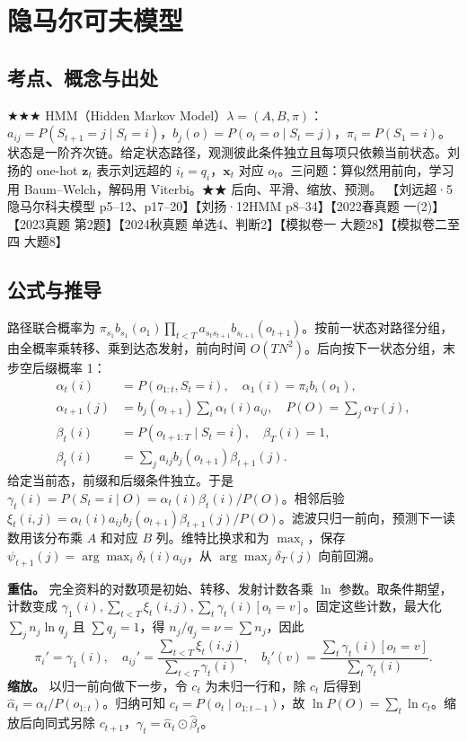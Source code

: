 \documentclass[UTF8,a4paper,zihao=-4,fontset=fandol]{ctexart}
\begin{document}
\section{隐马尔可夫模型}

\subsection{考点、概念与出处}
★★★ HMM（Hidden Markov Model）$\lambda=(A,B,\pi)$：$a_{ij}=P(S_{t+1}=j\mid S_t=i)$，$b_j(o)=P(o_t=o\mid S_t=j)$，$\pi_i=P(S_1=i)$。状态是一阶齐次链。给定状态路径，观测彼此条件独立且每项只依赖当前状态。刘扬的 one-hot $\bm z_t$ 表示刘远超的 $i_t=q_i$，$\bm x_t$ 对应 $o_t$。三问题：算似然用前向，学习用 Baum–Welch，解码用 Viterbi。★★ 后向、平滑、缩放、预测。 【刘远超·5 隐马尔科夫模型 p5–12、p17–20】【刘扬·12HMM p8–34】【2022春真题 一(2)】【2023真题 第2题】【2024秋真题 单选4、判断2】【模拟卷一 大题28】【模拟卷二至四 大题8】

\subsection{公式与推导}
路径联合概率为 $\pi_{s_1}b_{s_1}(o_1)\prod_{t<T}a_{s_t s_{t+1}}b_{s_{t+1}}(o_{t+1})$。按前一状态对路径分组，由全概率乘转移、乘到达态发射，前向时间 $O(TN^2)$。后向按下一状态分组，末步空后缀概率 1：
\[
\begin{aligned}
\alpha_t(i)&=P(o_{1:t},S_t=i),\quad \alpha_1(i)=\pi_i b_i(o_1),\\
\alpha_{t+1}(j)&=b_j(o_{t+1})\sum_i\alpha_t(i)a_{ij},\quad P(O)=\sum_j\alpha_T(j),\\
\beta_t(i)&=P(o_{t+1:T}\mid S_t=i),\quad \beta_T(i)=1,\\
\beta_t(i)&=\sum_j a_{ij}b_j(o_{t+1})\beta_{t+1}(j).
\end{aligned}
\]
给定当前态，前缀和后缀条件独立。于是 $\gamma_t(i)=P(S_t=i\mid O)=\alpha_t(i)\beta_t(i)/P(O)$。相邻后验 $\xi_t(i,j)=\alpha_t(i)a_{ij}b_j(o_{t+1})\beta_{t+1}(j)/P(O)$。滤波只归一前向，预测下一读数用该分布乘 $A$ 和对应 $B$ 列。维特比换求和为 $\max_i$，保存 $\psi_{t+1}(j)=\arg\max_i\delta_t(i)a_{ij}$，从 $\arg\max_j\delta_T(j)$ 向前回溯。

\textbf{重估。} 完全资料的对数项是初始、转移、发射计数各乘 $\ln$ 参数。取条件期望，计数变成 $\gamma_1(i),\sum_{t<T}\xi_t(i,j),\sum_t\gamma_t(i)[o_t=v]$。固定这些计数，最大化 $\sum_j n_j\ln q_j$ 且 $\sum q_j=1$，得 $n_j/q_j=\nu=\sum n_j$，因此
\[
\pi_i'=\gamma_1(i),\quad
a_{ij}'=\frac{\sum_{t<T}\xi_t(i,j)}{\sum_{t<T}\gamma_t(i)},\quad
b_i'(v)=\frac{\sum_t\gamma_t(i)[o_t=v]}{\sum_t\gamma_t(i)}.
\]
\textbf{缩放。} 以归一前向做下一步，令 $c_t$ 为未归一行和，除 $c_t$ 后得到 $\hat\alpha_t=\alpha_t/P(o_{1:t})$。归纳可知 $c_t=P(o_t\mid o_{1:t-1})$，故 $\ln P(O)=\sum_t\ln c_t$。缩放后向同式另除 $c_{t+1}$，$\gamma_t=\hat\alpha_t\odot\hat\beta_t$。
\end{document}
